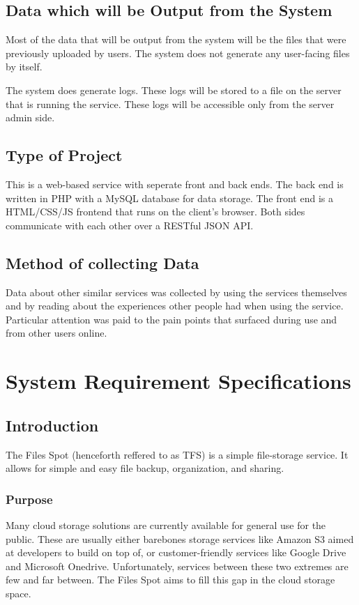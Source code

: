 \documentclass[12pt,a4paper]{report}
\begin{document}
\section{Data which will be Output from the System}\label{sec:data_which_will_be_output_from_system}
Most of the data that will be output from the system will be the files that were previously uploaded by users. The system does not generate any user-facing files by itself.

The system does generate logs. These logs will be stored to a file on the server that is running the service. These logs will be accessible only from the server admin side.
\section{Type of Project}\label{sec:type_of_project}
This is a web-based service with seperate front and back ends. The back end is written in PHP with a MySQL database for data storage. The front end is a HTML/CSS/JS frontend that runs on the client's browser. Both sides communicate with each other over a RESTful JSON API.
\section{Method of collecting Data}\label{sec:method_of_collecting_data}
Data about other similar services was collected by using the services themselves and by reading about the experiences other people had when using the service. Particular attention was paid to the pain points that surfaced during use and from other users online.
\newpage
\chapter{System Requirement Specifications}\label{cha:system_requirement_specifications}
\section{Introduction}\label{sec:introduction}
The Files Spot (henceforth reffered to as TFS) is a simple file-storage service. It allows for simple and easy file backup, organization, and sharing.
\subsection{Purpose}
Many cloud storage solutions are currently available for general use for the public. These are usually either barebones storage services like Amazon S3 aimed at developers to build on top of, or customer-friendly services like Google Drive and Microsoft Onedrive. Unfortunately, services between these two extremes are few and far between. The Files Spot aims to fill this gap in the cloud storage space.
\end{document}
